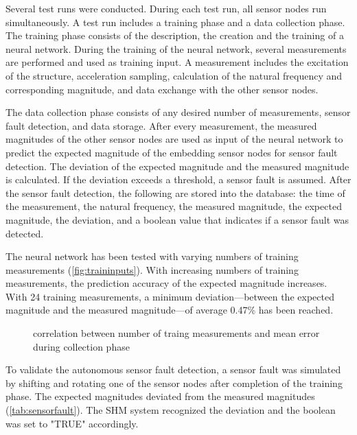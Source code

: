 \documentclass[12pt,a4paper]{scrartcl}
\begin{document}
Several test runs were conducted.
During each test run, all sensor nodes run simultaneously.
A test run includes a training phase and a data collection phase.
The training phase consists of the description, the creation and the training of a neural network.
During the training of the neural network, several measurements are performed and used as training input.
A measurement includes the excitation of the structure, acceleration sampling, calculation of the natural frequency and corresponding magnitude, and data exchange with the other sensor nodes.

The data collection phase consists of any desired number of measurements, sensor fault detection, and data storage.
After every measurement, the measured magnitudes of the other sensor nodes are used as input of the neural network to predict the expected magnitude of the embedding sensor nodes for sensor fault detection.
The deviation of the expected magnitude and the measured magnitude is calculated.
If the deviation exceeds a threshold, a sensor fault is assumed.
After the sensor fault detection, the following are stored into the database: the time of the measurement, the natural frequency, the measured magnitude, the expected magnitude, the deviation,  and a boolean value that indicates if a sensor fault was detected.

The neural network has been tested with varying numbers of training measurements (\autoref{fig:traininputs}).
With increasing numbers of training measurements, the prediction accuracy of the expected magnitude increases.
With 24 training measurements, a minimum deviation---between the expected magnitude and the measured magnitude---of average 0.47\% has been reached.

\begin{figure}[htb]
    \centering
    \caption{correlation between number of traing measurements and mean error during collection phase}
    \label{fig:traininputs}
\end{figure}

To validate the autonomous sensor fault detection, a sensor fault was simulated by shifting and rotating one of the sensor nodes after completion of the training phase.
The expected magnitudes deviated from the measured magnitudes (\autoref{tab:sensorfault}).
The SHM system recognized the deviation and the boolean was set to "TRUE" accordingly.
\end{document}
